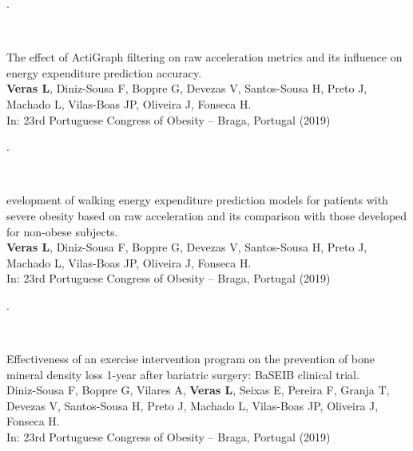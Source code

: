 \documentclass[10t]{article}
\begin{document}
\vspace{0.5em}

\noindent
\begin{minipage}[t]{0.15\linewidth}
	.
\end{minipage}
\
\begin{minipage}[t]{0.85\linewidth}
\begin{minipage}[t]{\columnwidth}
	The effect of ActiGraph filtering on raw acceleration metrics and its influence on energy expenditure prediction accuracy. \\
	\textbf{Veras L}, Diniz-Sousa F, Boppre G, Devezas V, Santos-Sousa H, Preto J, Machado L, Vilas-Boas JP, Oliveira J, Fonseca H.  \\
	In: 23rd Portuguese Congress of Obesity – Braga, Portugal (2019)
\end{minipage}
\end{minipage}

\vspace{0.5em}

\noindent
\begin{minipage}[t]{0.15\linewidth}
	.
\end{minipage}
\
\begin{minipage}[t]{0.85\linewidth}
\begin{minipage}[t]{\columnwidth}
	evelopment of walking energy expenditure prediction models for patients with severe obesity based on raw acceleration and its comparison with those developed for non-obese subjects. \\
	\textbf{Veras L}, Diniz-Sousa F, Boppre G, Devezas V, Santos-Sousa H, Preto J, Machado L, Vilas-Boas JP, Oliveira J, Fonseca H. \\
	In: 23rd Portuguese Congress of Obesity – Braga, Portugal (2019)
\end{minipage}
\end{minipage}

\vspace{0.5em}

\noindent
\begin{minipage}[t]{0.15\linewidth}
	.
\end{minipage}
\
\begin{minipage}[t]{0.85\linewidth}
\begin{minipage}[t]{\columnwidth}
	Effectiveness of an exercise intervention program on the prevention of bone mineral density loss 1-year after bariatric surgery: BaSEIB clinical trial. \\
	Diniz-Sousa F, Boppre G, Vilares A, \textbf{Veras L}, Seixas E, Pereira F, Granja T, Devezas V, Santos-Sousa H, Preto J, Machado L, Vilas-Boas JP, Oliveira J, Fonseca H.  \\
	In: 23rd Portuguese Congress of Obesity – Braga, Portugal (2019)
\end{minipage}
\end{minipage}
\end{document}
